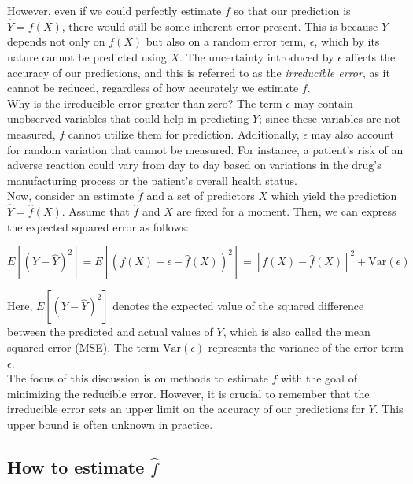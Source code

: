However, even if we could perfectly estimate $f$ so that our prediction is $\hat{Y} = f(X)$, there would still be some inherent error present. This is because $Y$ depends not only on $f(X)$ but also on a random error term, $\epsilon$, which by its nature cannot be predicted using $X$. The uncertainty introduced by $\epsilon$ affects the accuracy of our predictions, and this is referred to as the \textit{irreducible error}, as it cannot be reduced, regardless of how accurately we estimate $f$.\\

Why is the irreducible error greater than zero? The term $\epsilon$ may contain unobserved variables that could help in predicting $Y$; since these variables are not measured, $f$ cannot utilize them for prediction. Additionally, $\epsilon$ may also account for random variation that cannot be measured. For instance, a patient’s risk of an adverse reaction could vary from day to day based on variations in the drug’s manufacturing process or the patient’s overall health status.\\

Now, consider an estimate $\hat{f}$ and a set of predictors $X$ which yield the prediction $\hat{Y} = \hat{f}(X)$. Assume that $\hat{f}$ and $X$ are fixed for a moment. Then, we can express the expected squared error as follows:

\begin{equation}
    E[(Y - \hat{Y})^2] = E[(f(X) + \epsilon - \hat{f}(X))^2] = [f(X) - \hat{f}(X)]^2 + \text{Var}(\epsilon)
\end{equation}
\vspace{3pt}

Here, $E[(Y - \hat{Y})^2]$ denotes the expected value of the squared difference between the predicted and actual values of $Y$, which is also called the mean squared error (MSE). The term $\text{Var}(\epsilon)$ represents the variance of the error term $\epsilon$. \\

The focus of this discussion is on methods to estimate $f$ with the goal of minimizing the reducible error. However, it is crucial to remember that the irreducible error sets an upper limit on the accuracy of our predictions for $Y$. This upper bound is often unknown in practice.\\

\subsection{How to estimate $\hat{f}$}\cite{islr}

